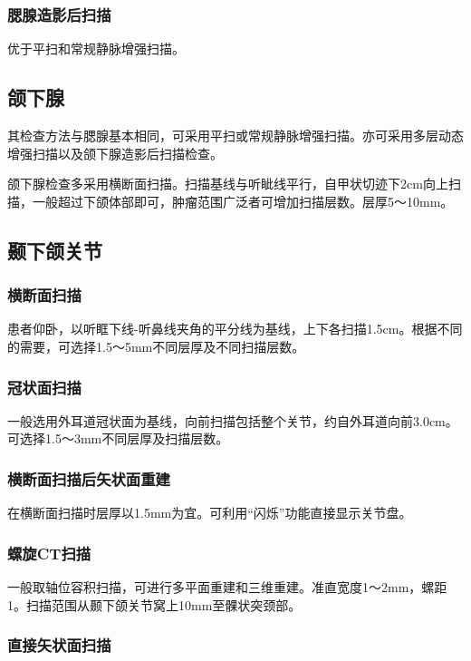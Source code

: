 \subsubsection{腮腺造影后扫描}

优于平扫和常规静脉增强扫描。

\subsection{颌下腺}

其检查方法与腮腺基本相同，可采用平扫或常规静脉增强扫描。亦可采用多层动态增强扫描以及颌下腺造影后扫描检查。

颌下腺检查多采用横断面扫描。扫描基线与听眦线平行，自甲状切迹下2cm向上扫描，一般超过下颌体部即可，肿瘤范围广泛者可增加扫描层数。层厚5～10mm。

\subsection{颞下颌关节}

\subsubsection{横断面扫描}

患者仰卧，以听眶下线-听鼻线夹角的平分线为基线，上下各扫描1.5cm。根据不同的需要，可选择1.5～5mm不同层厚及不同扫描层数。

\subsubsection{冠状面扫描}

一般选用外耳道冠状面为基线，向前扫描包括整个关节，约自外耳道向前3.0cm。可选择1.5～3mm不同层厚及扫描层数。

\subsubsection{横断面扫描后矢状面重建}

在横断面扫描时层厚以1.5mm为宜。可利用“闪烁”功能直接显示关节盘。

\subsubsection{螺旋CT扫描}

一般取轴位容积扫描，可进行多平面重建和三维重建。准直宽度1～2mm，螺距1。扫描范围从颞下颌关节窝上10mm至髁状突颈部。

\subsubsection{直接矢状面扫描}

